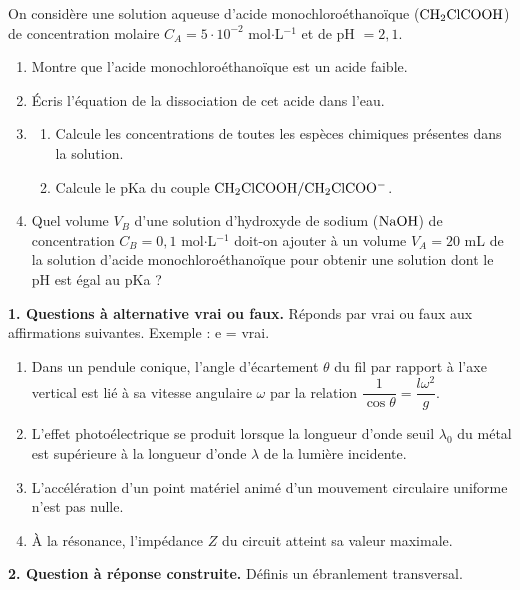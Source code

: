 \documentclass[11pt]{article}
\begin{document}
On considère une solution aqueuse d'acide monochloroéthanoïque ($\mathrm{CH_2ClCOOH}$) de concentration molaire $C_A = 5\cdot10^{-2}$ mol$\cdot$L$^{-1}$ et de pH $= 2{,}1$.

\begin{enumerate}
  \item Montre que l'acide monochloroéthanoïque est un acide faible.
  \item Écris l'équation de la dissociation de cet acide dans l'eau.
  \item \begin{enumerate}[label=\alph*.]
    \item Calcule les concentrations de toutes les espèces chimiques présentes dans la solution.
    \item Calcule le pKa du couple $\mathrm{CH_2ClCOOH/CH_2ClCOO^-}$.
  \end{enumerate}
  \item Quel volume $V_B$ d'une solution d'hydroxyde de sodium ($\mathrm{NaOH}$) de concentration $C_B = 0{,}1$ mol$\cdot$L$^{-1}$ doit-on ajouter à un volume $V_A = 20$ mL de la solution d'acide monochloroéthanoïque pour obtenir une solution dont le pH est égal au pKa ?
\end{enumerate}



\noindent\textbf{1. Questions à alternative vrai ou faux.} Réponds par vrai ou faux aux affirmations suivantes. Exemple : e = vrai.
\begin{enumerate}[label=\alph*.]
  \item Dans un pendule conique, l'angle d'écartement $\theta$ du fil par rapport à l'axe vertical est lié à sa vitesse angulaire $\omega$ par la relation $\dfrac{1}{\cos\theta} = \dfrac{l\omega^2}{g}$.
  \item L'effet photoélectrique se produit lorsque la longueur d'onde seuil $\lambda_0$ du métal est supérieure à la longueur d'onde $\lambda$ de la lumière incidente.
  \item L'accélération d'un point matériel animé d'un mouvement circulaire uniforme n'est pas nulle.
  \item À la résonance, l'impédance $Z$ du circuit atteint sa valeur maximale.
\end{enumerate}

\medskip
\noindent\textbf{2. Question à réponse construite.} Définis un ébranlement transversal.
\end{document}
